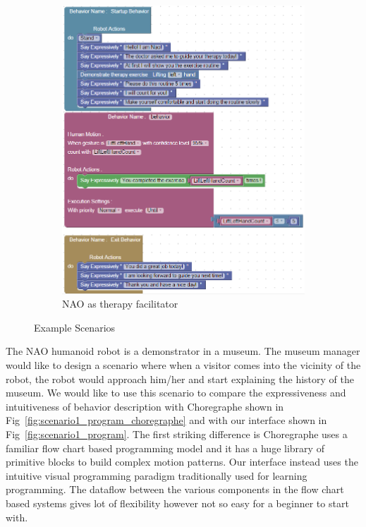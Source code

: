 \documentclass{llncs}
\begin{document}
\begin{figure}
\begin{subfigure}[t]{0.7\textwidth}
\includegraphics[width=\textwidth]{../thesis/assets/scenario2.png}
\caption[NAO as therapy facilitator]{NAO as therapy facilitator}
\label{fig:scenario2_program}
\end{subfigure}
\caption[Example Scenarios]{Example Scenarios}
\label{fig:scenarios}
\end{figure}
The NAO humanoid robot is a demonstrator in a museum. The museum manager would like to design a scenario where when a visitor comes into the vicinity of the robot, the robot would approach him/her and start explaining the history of the museum. We would like to use this scenario to compare the expressiveness and intuitiveness of behavior description with Choregraphe \cite{Choregraphe} shown in Fig~\ref{fig:scenario1_program_choregraphe} and with our interface shown in Fig~\ref{fig:scenario1_program}. The first striking difference is Choregraphe uses a familiar flow chart based programming model and it has a huge library of primitive blocks to build complex motion patterns. Our interface instead uses the intuitive visual programming paradigm traditionally used for learning programming. The dataflow between the various components in the flow chart based systems gives lot of flexibility however not so easy for a beginner to start with. 
\end{document}
